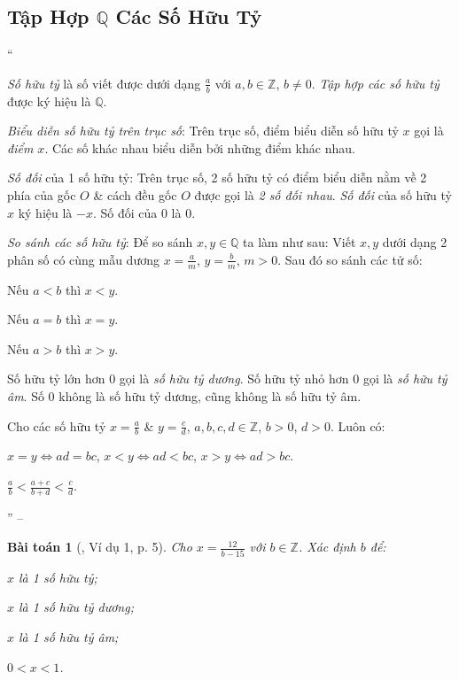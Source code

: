\documentclass{article}
\numberwithin{equation}{section}
\newtheorem{baitoan}{Bài toán}[section]
\begin{document}
\subsection{Tập Hợp $\mathbb{Q}$ Các Số Hữu Tỷ}
``\begin{enumerate*}
	\item[\textbf{1.}] \textit{Số hữu tỷ} là số viết được dưới dạng $\frac{a}{b}$ với $a,b\in\mathbb{Z}$, $b\ne 0$. \textit{Tập hợp các số hữu tỷ} được ký hiệu là $\mathbb{Q}$.
	\item[\textbf{2.}] \textit{Biểu diễn số hữu tỷ trên trục số}: Trên trục số, điểm biểu diễn số hữu tỷ $x$ gọi là \textit{điểm $x$}. Các số khác nhau biểu diễn bởi những điểm khác nhau.
	\item[\textbf{3.}] \textit{Số đối} của 1 số hữu tỷ: Trên trục số, 2 số hữu tỷ có điểm biểu diễn nằm về 2 phía của gốc $O$ \& cách đều gốc $O$ được gọi là \textit{2 số đối nhau}. \textit{Số đối} của số hữu tỷ $x$ ký hiệu là $-x$. Số đối của $0$ là $0$.
	\item[\textbf{4.}] \textit{So sánh các số hữu tỷ}: Để so sánh $x,y\in\mathbb{Q}$ ta làm như sau: Viết $x,y$ dưới dạng 2 phân số có cùng mẫu dương $x = \frac{a}{m}$, $y = \frac{b}{m}$, $m > 0$. Sau đó so sánh các tử số:
	\begin{enumerate*}
		\item[$\bullet$] Nếu $a < b$ thì $x < y$.
		\item[$\bullet$] Nếu $a = b$ thì $x = y$.
		\item[$\bullet$] Nếu $a > b$ thì $x > y$.
	\end{enumerate*}
	Số hữu tỷ lớn hơn $0$ gọi là \textit{số hữu tỷ dương}. Số hữu tỷ nhỏ hơn $0$ gọi là \textit{số hữu tỷ âm}. Số $0$ không là số hữu tỷ dương, cũng không là số hữu tỷ âm.
\end{enumerate*}

Cho các số hữu tỷ $x = \frac{a}{b}$ \& $y = \frac{c}{d}$, $a,b,c,d\in\mathbb{Z}$, $b > 0$, $d > 0$. Luôn có:
\begin{enumerate*}
	\item[$\bullet$] $x = y\Leftrightarrow ad = bc$, $x < y\Leftrightarrow ad < bc$, $x > y\Leftrightarrow ad > bc$.
	\item[$\bullet$] $\frac{a}{b} < \frac{a + c}{b + d} < \frac{c}{d}$.
\end{enumerate*}'' -- \cite[pp. 4--5]{Tuyen_Toan_7}

\begin{baitoan}[\cite{Tuyen_Toan_7}, Ví dụ 1, p. 5]
	Cho $x = \frac{12}{b - 15}$ với $b\in\mathbb{Z}$. Xác định $b$ để:
	\begin{enumerate*}
		\item[(a)] $x$ là 1 số hữu tỷ;
		\item[(b)] $x$ là 1 số hữu tỷ dương;
		\item[(c)] $x$ là 1 số hữu tỷ âm;
		\item[(d)] $0 < x < 1$.
	\end{enumerate*}
\end{baitoan}
\end{document}
